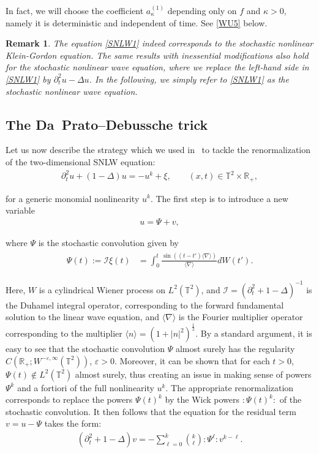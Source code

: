 \documentclass[%
11pt,  reqno]{amsart}
\newtheorem{remark}[theorem]{Remark}
\newcommand{\1}{\hspace{0.2mm}\text{I}\hspace{0.2mm}}
\newcommand{\noi}{\noindent}
\newcommand{\R}{\mathbb{R}}
\newcommand{\T}{\mathbb{T}}
\newcommand{\nb}{\nabla}
\newcommand{\Dl}{\Delta}
\newcommand{\eps}{\varepsilon}
\newcommand{\kk}{\kappa}
\newcommand{\dt}{\partial_t}
\renewcommand{\l}{\ell}
\newcommand{\jb}[1]
{\langle #1 \rangle}
\newcommand{\I}{\mathcal{I}}
\numberwithin{equation}{section}
\numberwithin{theorem}{section}
\begin{document}
In fact, we will choose the coefficient $a_{\kk}^{(1)}$ depending only on $f$
and $\kk > 0$,
namely it is deterministic and independent of time.
See \eqref{WU5} below.




\begin{remark}\rm

The equation \eqref{SNLW1}
indeed corresponds
to the stochastic nonlinear Klein-Gordon equation.
The same results with  inessential modifications
also hold for
the stochastic nonlinear wave equation,
where we replace the left-hand side in \eqref{SNLW1}
by $\dt^2 u- \Dl u$.
In the following, we simply refer to \eqref{SNLW1} as 
the stochastic nonlinear wave equation.

\end{remark}

\subsection{The Da~Prato--Debussche trick}

Let us now describe the strategy which we used in~\cite{GKO,GKOT} to tackle the renormalization 
of the two-dimensional  SNLW equation:
 \begin{align*}
\dt^2 u  + (1 -  \Dl)  u =  -u^k  + \xi,  
\qquad (x, t) \in \T^2\times \R_+,
\end{align*}


\noi
for a generic monomial nonlinearity $u^k$. The first step is to introduce a new variable
\begin{align}
\label{decomp}
u = \Psi+v,
\end{align}

\noi
where $\Psi$ is the stochastic convolution given by 
\begin{align*}
\begin{split}
\Psi(t)
 := 
\I \xi (t)
& =  \int_{0}^t \frac{\sin ((t-t')\jb{\nb})}{\jb{\nb}}dW(t').
\end{split}
\end{align*}

\noi
Here, 
$W$ is a cylindrical Wiener process on  $L^2(\T^2)$, 
 and $\I = (\dt^2 +1 - \Dl)^{-1}$ is the Duhamel integral operator, 
corresponding to 
the forward fundamental solution to the linear wave equation,
 and  
$\jb{\nb}$ is the Fourier multiplier operator corresponding to the multiplier 
 $\jb{n} = (1 + |n|^2)^\frac{1}{2}$.
By a standard argument, 
it is easy to see that the stochastic convolution $\Psi$
almost surely has the regularity $ C(\R_+; W^{-\eps, \infty}(\T^2))$, $\eps > 0$.
Moreover,  it can be shown that for each $t> 0$, $\Psi (t)\notin L^2(\T^2)$ almost surely, thus creating  an issue in making sense of powers
$\Psi^k$ and a fortiori of the full nonlinearity $u^k$. The appropriate renormalization corresponds to replace the powers $\Psi(t)^k$ by the Wick powers $:\! \Psi(t)^k\!:$ of the stochastic convolution.
It then follows that the equation for the residual term $v = u - \Psi $ takes the form:
\begin{align}
(\dt^2 + 1 -  \Dl)  v =  -\sum_{\l=0}^k {k\choose \l} :\! \Psi^\l   \!: v^{k-\ell}. 
\label{SNLW2b}
\end{align}
\end{document}
